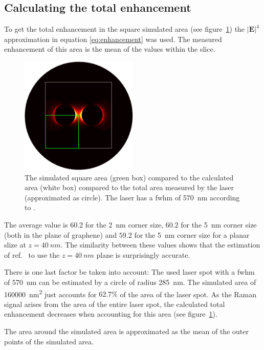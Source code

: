 \subsection{Calculating the total enhancement}

To get the total enhancement in the square simulated area (see figure~\ref{fig:symmetry}) the $\mathbf{|E|}^4$ approximation in equation \ref{eq:enhancement} was used. The measured enhancement of this area is the mean of the values within the slice.

\begin{figure}[!h]
  \centering
  \includegraphics[width=0.5\textwidth]{./images/fwhm-chart.jpg}
  \caption{The simulated square area (green box) compared to the calculated area (white box) compared to the total area measured by the laser (approximated as circle). The laser has a fwhm of \SI{570}{nm} according to \cite{heeg}.}
  \label{fig:symmetry}
\end{figure}

The average value is $60.2$ for the \SI{2}{nm} corner size, $60.2$ for the \SI{5}{nm} corner size (both in the plane of graphene) and $59.2$ for the \SI{5}{nm} corner size for a planar slize at $z=\SI{40}{nm}$. The similarity between these values shows that the estimation of ref.~\cite{heeg} to use the $z=\SI{40}{nm}$ plane is surprisingly accurate.

There is one last factor be taken into account: The used laser spot with a fwhm of \SI{570}{nm} can be estimated by a circle of radius \SI{285}{nm}. The simulated area of \SI{160 000}{nm^2} just accounts for $62.7\%$ of the area of the laser spot. As the Raman signal arises from the area of the entire laser spot, the calculated total enhancement decreases when accounting for this area (see figure~\ref{fig:symmetry}).

The area around the simulated area is approximated as the mean of the outer points of the simulated area.

